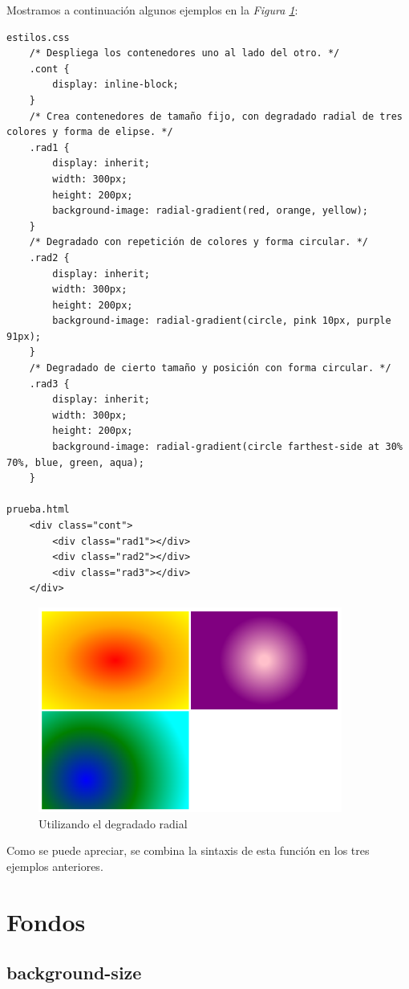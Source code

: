 Mostramos a continuación algunos ejemplos en la \textit{Figura \ref{fig: 46}}:
\begin{lstlisting}
estilos.css
    /* Despliega los contenedores uno al lado del otro. */
    .cont {
        display: inline-block;
    }
    /* Crea contenedores de tamaño fijo, con degradado radial de tres colores y forma de elipse. */
    .rad1 {
        display: inherit;
        width: 300px;
        height: 200px;
        background-image: radial-gradient(red, orange, yellow);
    }
    /* Degradado con repetición de colores y forma circular. */
    .rad2 {
        display: inherit;
        width: 300px;
        height: 200px;
        background-image: radial-gradient(circle, pink 10px, purple 91px);
    }
    /* Degradado de cierto tamaño y posición con forma circular. */
    .rad3 {
        display: inherit;
        width: 300px;
        height: 200px;
        background-image: radial-gradient(circle farthest-side at 30% 70%, blue, green, aqua);
    }

prueba.html
    <div class="cont">
        <div class="rad1"></div>
        <div class="rad2"></div>
        <div class="rad3"></div>
    </div>
\end{lstlisting}
\begin{figure}[H]
    \centering
    \caption{Utilizando el degradado radial}
    \label{fig: 46}
    \includegraphics[width=10cm]{ss/radial-gradient.png}
\end{figure}

Como se puede apreciar, se combina la sintaxis de esta función en los tres ejemplos anteriores.



\section{Fondos}


\subsection{background-size}

